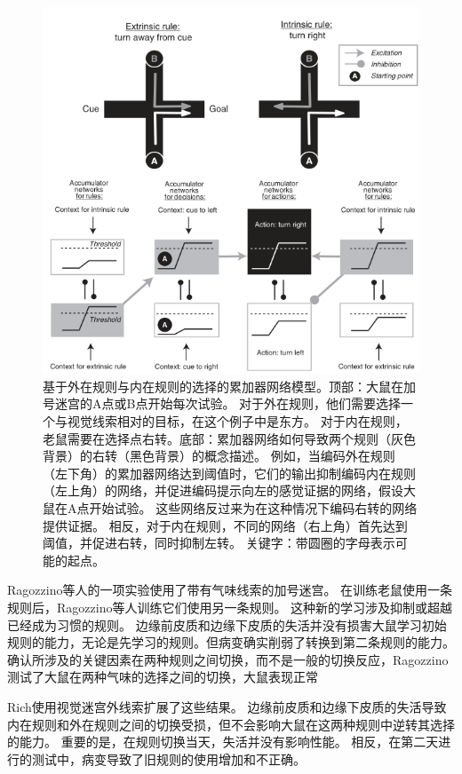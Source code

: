 \begin{figure}[!htb]
	\centering
	\includegraphics{image_pfc/Fig_3_6}
	\caption{基于外在规则与内在规则的选择的累加器网络模型。顶部：大鼠在加号迷宫的A点或B点开始每次试验。
		对于外在规则，他们需要选择一个与视觉线索相对的目标，在这个例子中是东方。
		对于内在规则，老鼠需要在选择点右转。底部：累加器网络如何导致两个规则（灰色背景）的右转（黑色背景）的概念描述。
		例如，当编码外在规则（左下角）的累加器网络达到阈值时，它们的输出抑制编码内在规则（左上角）的网络，并促进编码提示向左的感觉证据的网络，假设大鼠在A点开始试验。
		这些网络反过来为在这种情况下编码右转的网络提供证据。
		相反，对于内在规则，不同的网络（右上角）首先达到阈值，并促进右转，同时抑制左转。
		关键字：带圆圈的字母表示可能的起点。}
	\label{fig:3_6}
\end{figure}


Ragozzino等人\cite{ragozzino1999involvement}的一项实验使用了带有气味线索的加号迷宫。
在训练老鼠使用一条规则后，Ragozzino等人训练它们使用另一条规则。
这种新的学习涉及抑制或超越已经成为习惯的规则。
边缘前皮质和边缘下皮质的失活并没有损害大鼠学习初始规则的能力，无论是先学习的规则。但病变确实削弱了转换到第二条规则的能力。
确认所涉及的关键因素在两种规则之间切换，而不是一般的切换反应，Ragozzino\cite{ragozzino2007contribution}测试了大鼠在两种气味的选择之间的切换，大鼠表现正常\par


Rich\cite{rich2007prelimbic}使用视觉迷宫外线索扩展了这些结果。
边缘前皮质和边缘下皮质的失活导致内在规则和外在规则之间的切换受损，但不会影响大鼠在这两种规则中逆转其选择的能力。
重要的是，在规则切换当天，失活并没有影响性能。
相反，在第二天进行的测试中，病变导致了旧规则的使用增加和不正确。\par


